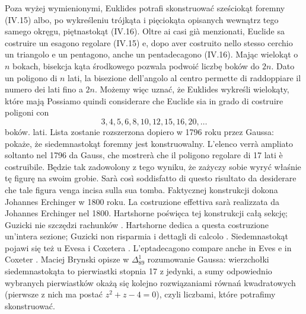 Poza wyżej wymienionymi, Euklides potrafi skonstruować sześciokąt foremny (IV.15) albo, po wykreśleniu trójkąta i pięciokąta opisanych wewnątrz tego samego okręgu, piętnastokąt (IV.16). %
Oltre ai casi già menzionati, Euclide sa costruire un esagono regolare (IV.15) e, dopo aver costruito nello stesso cerchio un triangolo e un pentagono, anche un pentadecagono (IV.16). %
Mając wielokąt o $n$ bokach, bisekcja kąta środkowego pozwala podwoić liczbę boków do $2n$. %
Dato un poligono di $n$ lati, la bisezione dell'angolo al centro permette di raddoppiare il numero dei lati fino a $2n$. %
Możemy więc uznać, że Euklides wykreśli wielokąty, które mają %
Possiamo quindi considerare che Euclide sia in grado di costruire poligoni con %
\begin{equation}
    3, 4, 5, 6, 8, 10, 12, 15, 16, 20, \ldots
\end{equation}
boków. %
lati. %
Lista zostanie rozszerzona dopiero w 1796 roku przez Gaussa: pokaże, że siedemnastokąt foremny jest konstruowalny. %
L'elenco verrà ampliato soltanto nel 1796 da Gauss, che mostrerà che il poligono regolare di 17 lati è costruibile. %
%
Będzie tak zadowolony z tego wyniku, że zażyczy sobie wyryć właśnie tę figurę na swoim grobie. %
Sarà così soddisfatto di questo risultato da desiderare che tale figura venga incisa sulla sua tomba. %
Faktycznej konstrukcji dokona Johannes Erchinger w 1800 roku. %
La costruzione effettiva sarà realizzata da Johannes Erchinger nel 1800. %
%
Hartshorne \cite[s. 250-259]{hartshorne_2000} poświęca tej konstrukcji całą sekcję; Guzicki nie szczędzi rachunków \cite[s. 290-299]{guzicki_2021}. %
Hartshorne \cite[p. 250-259]{hartshorne_2000} dedica a questa costruzione un'intera sezione; Guzicki non risparmia i dettagli di calcolo \cite[p. 290-299]{guzicki_2021}. %
Siedemnastokąt pojawi się też u Evesa \cite[s. 185-191]{eves1_1972} i Coxetera \cite[s. 42, 43]{coxeter_1967}. %
L'eptadecagono compare anche in Eves \cite[p. 185-191]{eves1_1972} e in Coxeter \cite[p. 42, 43]{coxeter_1967}. %
Maciej Brynski opisze w $\Delta_{89}^{1}$ rozumowanie Gaussa: wierzchołki siedemnastokąta to pierwiastki stopnia 17 z jedynki, a sumy odpowiednio wybranych pierwiastków okażą się kolejno rozwiązaniami równań kwadratowych (pierwsze z nich ma postać $z^2 + z - 4 = 0$), czyli liczbami, które potrafimy skonstruować. %

